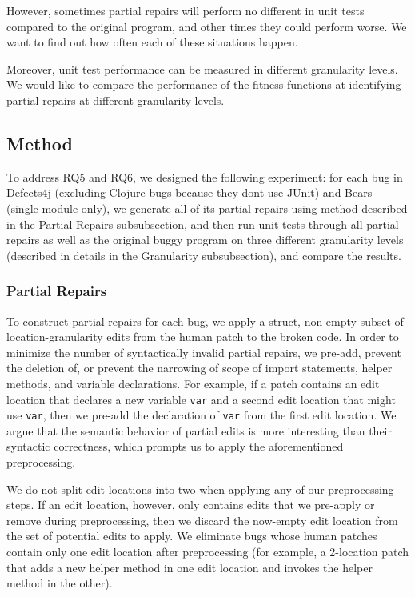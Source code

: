 \documentclass[sigconf, timestamp-false, anonymous=true]{acmart}
\begin{document}
However, sometimes partial repairs will perform no different in unit tests compared 
to the original program, and other times they could perform worse. We want to find 
out how often each of these situations happen.

Moreover, unit test performance can be measured in different granularity levels. 
We would like to compare the performance of the fitness functions at identifying 
partial repairs at different granularity levels.


\subsection{Method}

To address RQ5 and RQ6, we designed the following experiment: for each bug in 
Defects4j 
(excluding Clojure bugs because they dont use JUnit) 
and Bears (single-module only), we generate all of its partial repairs using method described in 
the Partial Repairs subsubsection, and then run unit tests through all partial repairs
as well as the original buggy program on three different granularity levels (described
in details in the Granularity subsubsection), and compare the results.

\subsubsection{Partial Repairs}

To construct partial repairs for each bug, we apply a struct, non-empty subset 
of location-granularity edits from the human patch to the broken code.
In order to minimize the number of syntactically invalid partial repairs, 
we pre-add, prevent the deletion of, or prevent the narrowing of scope of 
import statements, helper methods, and variable declarations.
For example, if a patch contains an edit location that declares a new variable 
\texttt{var} and a second edit location that might use \texttt{var}, then we 
pre-add the declaration of \texttt{var} from the first edit location. 
We argue that the semantic behavior of partial edits is more interesting 
than their syntactic correctness, which prompts us to apply the 
aforementioned preprocessing.

We do not split edit locations into two when applying any of our preprocessing steps. 
If an edit location, however, only contains edits that we pre-apply or remove during 
preprocessing, then we discard the now-empty edit location from the set of 
potential edits to apply. We eliminate bugs whose human patches contain only 
one edit location after preprocessing (for example, a 2-location patch that adds a new 
helper method in one edit location and invokes the helper method in the other). 
\end{document}

